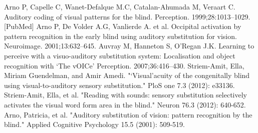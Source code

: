 \documentclass{article}
\begin{document}
\begin{thebibliography}{9}
Arno P, Capelle C, Wanet-Defalque M.C, Catalan-Ahumada M, Veraart C. Auditory coding of visual patterns for the blind. Perception. 1999;28:1013–1029. [PubMed]
Arno P, De Volder A.G, Vanlierde A. et al. Occipital activation by pattern recognition in the early blind using auditory substitution for vision. Neuroimage. 2001;13:632–645.
Auvray M, Hanneton S, O’Regan J.K. Learning to perceive with a visuo-auditory substitution system: Localisation and object recognition with ‘The vOICe’ Perception. 2007;36:416–430.
Striem-Amit, Ella, Miriam Guendelman, and Amir Amedi. "‘Visual’acuity of the congenitally blind using visual-to-auditory sensory substitution." PloS one 7.3 (2012): e33136.
Striem-Amit, Ella, et al. "Reading with sounds: sensory substitution selectively activates the visual word form area in the blind." Neuron 76.3 (2012): 640-652.
Arno, Patricia, et al. "Auditory substitution of vision: pattern recognition by the blind." Applied Cognitive Psychology 15.5 (2001): 509-519.

\end{thebibliography}
\end{document}
